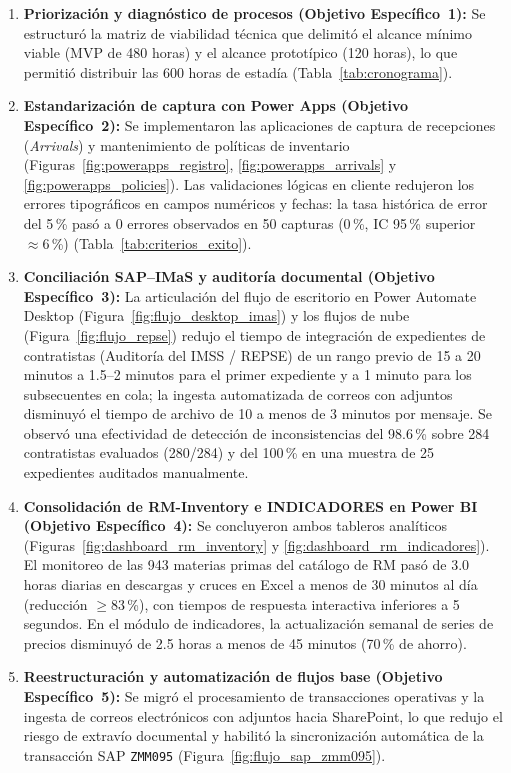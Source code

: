 \begin{enumerate}
    \item \textbf{Priorización y diagnóstico de procesos (Objetivo Específico~1):} Se estructuró la matriz de viabilidad técnica que delimitó el alcance mínimo viable (MVP de 480 horas) y el alcance prototípico (120 horas), lo que permitió distribuir las 600 horas de estadía (Tabla~\ref{tab:cronograma}).
    \item \textbf{Estandarización de captura con Power Apps (Objetivo Específico~2):} Se implementaron las aplicaciones de captura de recepciones (\emph{Arrivals}) y mantenimiento de políticas de inventario (Figuras~\ref{fig:powerapps_registro}, \ref{fig:powerapps_arrivals} y \ref{fig:powerapps_policies}). Las validaciones lógicas en cliente redujeron los errores tipográficos en campos numéricos y fechas: la tasa histórica de error del 5\,\% pasó a 0 errores observados en 50 capturas (0\,\%, IC 95\,\% superior $\approx 6$\,\%) (Tabla~\ref{tab:criterios_exito}).
    \item \textbf{Conciliación SAP--IMaS y auditoría documental (Objetivo Específico~3):} La articulación del flujo de escritorio en Power Automate Desktop (Figura~\ref{fig:flujo_desktop_imas}) y los flujos de nube (Figura~\ref{fig:flujo_repse}) redujo el tiempo de integración de expedientes de contratistas (Auditoría del IMSS / REPSE) de un rango previo de 15 a 20 minutos a 1.5--2 minutos para el primer expediente y a 1 minuto para los subsecuentes en cola; la ingesta automatizada de correos con adjuntos disminuyó el tiempo de archivo de 10 a menos de 3 minutos por mensaje. Se observó una efectividad de detección de inconsistencias del 98.6\,\% sobre 284 contratistas evaluados (280/284) y del 100\,\% en una muestra de 25 expedientes auditados manualmente.
    \item \textbf{Consolidación de RM-Inventory e INDICADORES en Power BI (Objetivo Específico~4):} Se concluyeron ambos tableros analíticos (Figuras~\ref{fig:dashboard_rm_inventory} y \ref{fig:dashboard_rm_indicadores}). El monitoreo de las 943 materias primas del catálogo de RM pasó de 3.0 horas diarias en descargas y cruces en Excel a menos de 30 minutos al día (reducción $\ge 83$\,\%), con tiempos de respuesta interactiva inferiores a 5 segundos. En el módulo de indicadores, la actualización semanal de series de precios disminuyó de 2.5 horas a menos de 45 minutos (70\,\% de ahorro).
    \item \textbf{Reestructuración y automatización de flujos base (Objetivo Específico~5):} Se migró el procesamiento de transacciones operativas y la ingesta de correos electrónicos con adjuntos hacia SharePoint, lo que redujo el riesgo de extravío documental y habilitó la sincronización automática de la transacción SAP \texttt{ZMM095} (Figura~\ref{fig:flujo_sap_zmm095}).

\end{enumerate}
